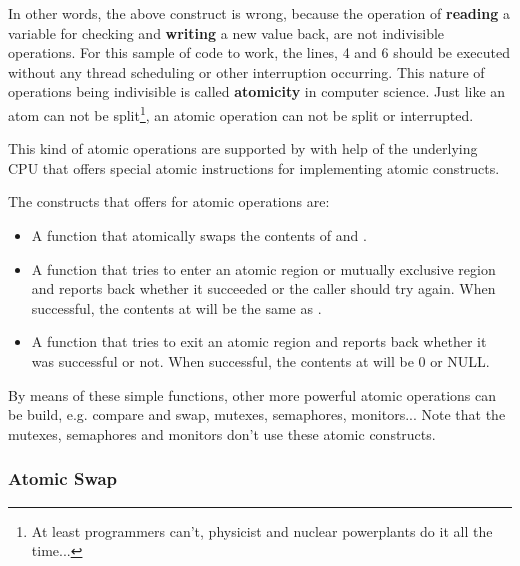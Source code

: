 In other words, the above construct is wrong, because the operation of
\textbf{reading} a variable for checking and \textbf{writing} a new value back,
are not indivisible operations. For this sample of code to work, the lines,
4 and 6 should be executed without any thread scheduling or other
interruption occurring. This nature of operations being indivisible is called
\textbf{atomicity} in computer science. Just like an atom can not be
split\footnote{At least programmers can't, physicist and nuclear powerplants do it all the time...},
an atomic operation can not be split or interrupted.

This kind of atomic operations are supported by \oswald with help of the
underlying CPU that offers special atomic instructions for implementing atomic
constructs.

The constructs that \oswald offers for atomic operations are:

\begin{itemize}
\item {}

A function that atomically swaps the contents of  and
.

\item {}

A function that tries to enter an atomic region or mutually exclusive
region and reports back whether it succeeded or the caller should try again.
When successful, the contents at  will be the same as .

\item {}

A function that tries to exit an atomic region and reports back whether it
was successful or not. When successful, the contents at 
will be 0 or NULL.
\end{itemize}

By means of these simple functions, other more powerful atomic operations
can be build, e.g. compare and swap, mutexes, semaphores, monitors... Note
that the \oswald mutexes, semaphores and monitors don't use these atomic
constructs.

\subsubsection{Atomic Swap}

